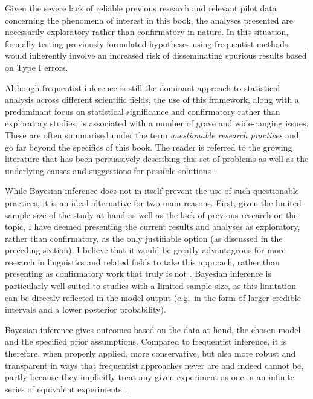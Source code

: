 Given the severe lack of reliable previous research and relevant pilot data concerning the phenomena of interest in this book, the analyses  presented are necessarily exploratory rather than confirmatory in nature. In this situation, formally testing previously formulated hypotheses using frequentist methods would inherently involve an increased risk of disseminating spurious results based on Type I errors.

Although frequentist inference is still the dominant approach to statistical analysis across different scientific fields, the use of this framework, along with a predominant focus on statistical significance and confirmatory rather than exploratory studies, is associated with a number of grave and wide-ranging issues. These are often summarised under the term \textit{questionable research practices} and go far beyond the specifics of this book. The reader is referred to the growing literature that has been persuasively describing this set of problems as well as the underlying causes and suggestions for possible solutions \citep[e.g.][]{smaldinoNaturalSelectionBad2016,corettaMultidimensionalSignalsAnalytic2023,amrheinScientistsRiseStatistical2019, bishopReinFourHorsemen2019, headExtentConsequencesPhacking2015, johnMeasuringPrevalenceQuestionable2012, roettgerEmergentDataAnalysis2019, roettgerResearcherDegreesFreedom2019}.

While Bayesian inference does not in itself prevent the use of such questionable practices, it is an ideal alternative for two main reasons. First, given the limited sample size of the study at hand as well as the lack of previous research on the topic, I have deemed presenting the current results and analyses as exploratory, rather than confirmatory, as the only justifiable option (as discussed in the preceding section). I believe that it would be greatly advantageous for more research in linguistics and related fields to take this approach, rather than presenting as confirmatory work that truly is not \citep{kerrHARKingHypothesizingResults1998, murphyHARKingHowBadly2019}. Bayesian inference is particularly well suited to studies with a limited sample size, as this limitation can be directly reflected in the model output (e.g.~in the form of larger credible intervals and a lower posterior probability).

Bayesian inference gives outcomes based on the data at hand, the chosen model and the specified prior assumptions. Compared to frequentist inference, it is therefore, when properly applied, more conservative, but also more robust and transparent in ways that frequentist approaches never are and indeed cannot be, partly because they implicitly treat any given experiment as one in an infinite series of equivalent experiments \citep{gelmanBayesianWorkflow2020, lemoineMovingNoninformativePriors2019, mcelreathStatisticalRethinkingBayesian2020, winterPoissonRegressionLinguists2021a}.

